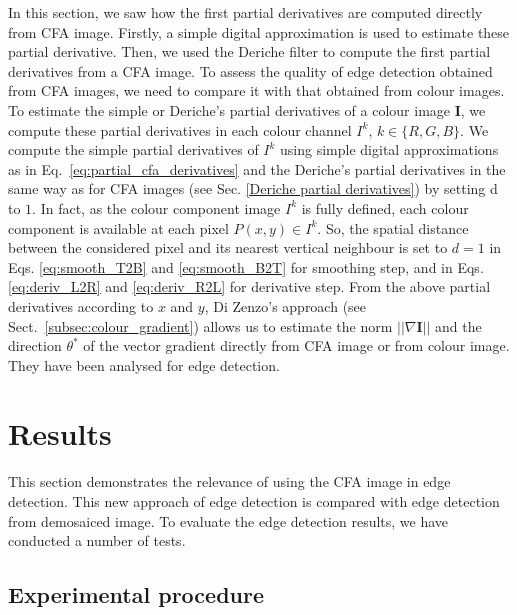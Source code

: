\documentclass[twoside]{article}
\begin{document}

In this section, we saw how the first partial derivatives are computed directly from CFA image. Firstly, a simple digital approximation is used to estimate these partial derivative. Then, we used the Deriche filter to compute the first partial derivatives from a CFA image. To assess the quality of edge detection obtained from CFA images, we need to compare it with that obtained from colour images. To estimate the simple or Deriche's partial derivatives of a colour image $\textbf{I}$, we compute these partial derivatives in each colour channel $I^k$, $k\in\{R,G,B\}$. We compute the simple partial derivatives of $I^k$ using simple digital approximations as in Eq.~\eqref{eq:partial_cfa_derivatives} and the Deriche's partial derivatives in the same way as for CFA images (see Sec. \ref{Deriche partial derivatives}) by setting d to $1$. In fact, as the colour component image $I^k$ is fully defined, each colour component is available at each pixel $P(x,y) \in I^k$. So, the spatial distance between the considered pixel and its nearest vertical neighbour is set to $d=1$ in Eqs. \eqref{eq:smooth_T2B} and \eqref{eq:smooth_B2T} for smoothing step, and in Eqs. \eqref{eq:deriv_L2R} and \eqref{eq:deriv_R2L} for derivative step. From the above partial derivatives according to $x$ and $y$, Di Zenzo's approach (see Sect.~\ref{subsec:colour_gradient}) allows us to estimate the norm $||\nabla \mathbf{I}||$ and the direction $\theta^{*}$ of the vector gradient directly from CFA image or from colour image. They have been analysed for edge detection.   







	
\section{Results}
\label{sec:Results}
This section demonstrates the relevance of using the CFA image in edge detection. This new approach of edge detection is compared with edge detection from demosaiced image. To evaluate the edge detection results, we have conducted a number of tests.   



\subsection{Experimental procedure}
\label{subsec:Experimental procedure}
\end{document}
